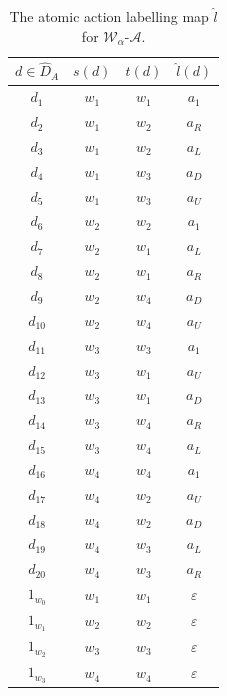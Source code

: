 \begin{table}[H]
    \centering
    \begin{tabular}{c|cc||c}
        \hline
        $d \in \hat{D}_{A}$ & $s(d)$  & $t(d)$  & $\hat{l}(d)$ \\
        \hline
        $d_{1}$         & $w_{1}$ & $w_{1}$ & $a_{1}$          \\
        $d_{2}$         & $w_{1}$ & $w_{2}$ & $a_{R}$          \\
        $d_{3}$         & $w_{1}$ & $w_{2}$ & $a_{L}$          \\
        $d_{4}$         & $w_{1}$ & $w_{3}$ & $a_{D}$          \\
        $d_{5}$         & $w_{1}$ & $w_{3}$ & $a_{U}$          \\
        $d_{6}$         & $w_{2}$ & $w_{2}$ & $a_{1}$          \\
        $d_{7}$         & $w_{2}$ & $w_{1}$ & $a_{L}$          \\
        $d_{8}$         & $w_{2}$ & $w_{1}$ & $a_{R}$          \\
        $d_{9}$         & $w_{2}$ & $w_{4}$ & $a_{D}$          \\
        $d_{10}$        & $w_{2}$ & $w_{4}$ & $a_{U}$          \\
        $d_{11}$        & $w_{3}$ & $w_{3}$ & $a_{1}$          \\
        $d_{12}$        & $w_{3}$ & $w_{1}$ & $a_{U}$          \\
        $d_{13}$        & $w_{3}$ & $w_{1}$ & $a_{D}$          \\
        $d_{14}$        & $w_{3}$ & $w_{4}$ & $a_{R}$          \\
        $d_{15}$        & $w_{3}$ & $w_{4}$ & $a_{L}$          \\
        $d_{16}$        & $w_{4}$ & $w_{4}$ & $a_{1}$          \\
        $d_{17}$        & $w_{4}$ & $w_{2}$ & $a_{U}$          \\
        $d_{18}$        & $w_{4}$ & $w_{2}$ & $a_{D}$          \\
        $d_{19}$        & $w_{4}$ & $w_{3}$ & $a_{L}$          \\
        $d_{20}$        & $w_{4}$ & $w_{3}$ & $a_{R}$          \\
        $1_{w_{0}}$     & $w_{1}$ & $w_{1}$ & $\varepsilon$   \\
        $1_{w_{1}}$     & $w_{2}$ & $w_{2}$ & $\varepsilon$   \\
        $1_{w_{2}}$     & $w_{3}$ & $w_{3}$ & $\varepsilon$   \\
        $1_{w_{3}}$     & $w_{4}$ & $w_{4}$ & $\varepsilon$   \\
    \end{tabular}
    \caption{
    The atomic action labelling map $\hat{l}$ for $\mathscr{W}_{\alpha}$-$\mathscr{A}$.
    }
    \label{tab:2x2_cyclical_labelling_with_min_actions}
\end{table}


